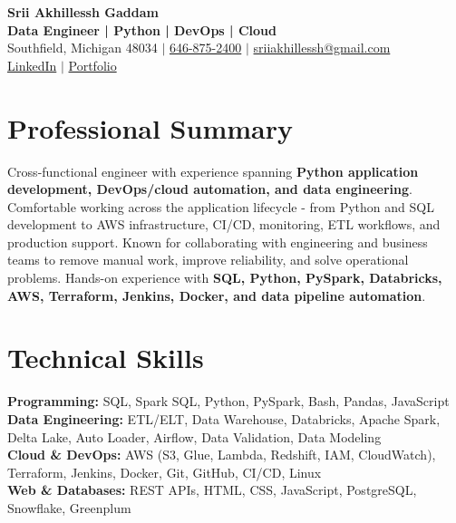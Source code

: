 \documentclass[letterpaper,10pt]{article}
\begin{document}
\fontsize{9.35pt}{10.45pt}\selectfont

\begin{center}
    {\LARGE \textbf{Srii Akhillessh Gaddam}} \\[-1pt]
    \textbf{Data Engineer | Python | DevOps | Cloud} \\[2pt]
    Southfield, Michigan 48034 $|$
    \href{tel:6468752400}{646-875-2400} $|$
    \href{mailto:sriiakhillessh@gmail.com}{sriiakhillessh@gmail.com} \\[1pt]
    \href{https://www.linkedin.com/in/srii-akhiilessh-gaddam-b48668191/}{LinkedIn} $|$
    \href{https://sriiakhillesshg.github.io/portfolio/}{Portfolio}
\end{center}
\vspace{-8pt}

\section{Professional Summary}
\small{Cross-functional engineer with experience spanning \textbf{Python application development, DevOps/cloud automation, and data engineering}. Comfortable working across the application lifecycle - from Python and SQL development to AWS infrastructure, CI/CD, monitoring, ETL workflows, and production support. Known for collaborating with engineering and business teams to remove manual work, improve reliability, and solve operational problems. Hands-on experience with \textbf{SQL, Python, PySpark, Databricks, AWS, Terraform, Jenkins, Docker, and data pipeline automation}.}

\section{Technical Skills}
\small{
\textbf{Programming:} SQL, Spark SQL, Python, PySpark, Bash, Pandas, JavaScript \\
\textbf{Data Engineering:} ETL/ELT, Data Warehouse, Databricks, Apache Spark, Delta Lake, Auto Loader, Airflow, Data Validation, Data Modeling \\
\textbf{Cloud \& DevOps:} AWS (S3, Glue, Lambda, Redshift, IAM, CloudWatch), Terraform, Jenkins, Docker, Git, GitHub, CI/CD, Linux \\
\textbf{Web \& Databases:} REST APIs, HTML, CSS, JavaScript, PostgreSQL, Snowflake, Greenplum
}
\end{document}
